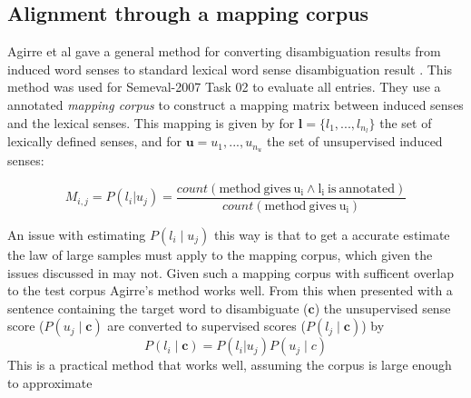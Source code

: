 \documentclass{sig-alternate}
\renewcommand{\c}{\mathbf{c}}
\renewcommand{\l}{\mathbf{l}}
\renewcommand{\u}{\mathbf{u}}
\begin{document}

\subsection{Alignment through a mapping corpus}


Agirre et al gave a general method for converting disambiguation results from induced word senses to standard lexical word sense disambiguation result \parencite{agirre2006}. This method was used for Semeval-2007 Task 02 \parencite{SemEval2007WSIandWSD} to evaluate all entries.
They use a annotated \emph{mapping corpus} to construct a mapping matrix between induced senses and the lexical senses.
This mapping is given by for $\l=\{l_1,..., l_{n_l}\}$ the set of lexically defined senses, and for $\u={u_1,...,u_{n_u}}$ the set of unsupervised induced senses:

\begin{equation} \label{eq:agireemap}
M_{i,j} = P(l_i | u_j) = \frac{count(\mathrm{method\: gives\: u_i \wedge l_i\: is\: annotated})}{count(\mathrm{method\: gives\: u_i})}
\end{equation}

An issue with estimating $P(l_i \mid u_j)$ this way is that to get a accurate estimate the law of large samples must apply to the mapping corpus, which given the issues discussed in  may not. Given such a mapping corpus with sufficent overlap to the test corpus Agirre's method works well. 
From this  when presented with a sentence containing the target word to disambiguate ($\c$) the unsupervised sense score ($P(u_j \mid \c)$ are converted to supervised scores ($P(l_j \mid \c)$) by 
\begin{equation} \label{eq:agireewsd}
P(l_i \mid \c) = P(l_i | u_j) P(u_j \mid c)
\end{equation}
This is a practical method that works well, assuming the corpus is large enough to approximate





\end{document}
